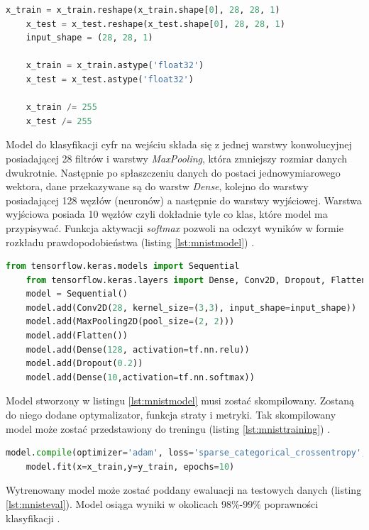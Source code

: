 \documentclass[a4paper,12pt,oneside]{book} %
\begin{document}
\begin{lstlisting}[language=Python, caption={Zmiana rozmiarów tablic i normalizacja \cite{mnistapp}}, label={lst:mnistreshape}]
	x_train = x_train.reshape(x_train.shape[0], 28, 28, 1)
	x_test = x_test.reshape(x_test.shape[0], 28, 28, 1)
	input_shape = (28, 28, 1)
	
	x_train = x_train.astype('float32')
	x_test = x_test.astype('float32')
	
	x_train /= 255
	x_test /= 255
\end{lstlisting}

Model do klasyfikacji cyfr na wejściu składa się z jednej warstwy konwolucyjnej posiadającej 28 filtrów i warstwy \emph{MaxPooling}, która zmniejszy rozmiar danych dwukrotnie. Następnie po spłaszczeniu danych do postaci jednowymiarowego wektora, dane przekazywane są do warstw \emph{Dense}, kolejno do warstwy posiadającej 128 węzłów (neuronów) a następnie do warstwy wyjściowej. Warstwa wyjściowa posiada 10 węzłów czyli dokładnie tyle co klas, które model ma przypisywać. Funkcja aktywacji \emph{softmax} pozwoli na odczyt wyników w formie rozkładu prawdopodobieństwa (listing \ref{lst:mnistmodel}) \cite{mnistapp}.

\begin{lstlisting}[language=Python, caption={Budowa modelu \cite{mnistapp}}, label={lst:mnistmodel}]
	from tensorflow.keras.models import Sequential
	from tensorflow.keras.layers import Dense, Conv2D, Dropout, Flatten, MaxPooling2D
	model = Sequential()
	model.add(Conv2D(28, kernel_size=(3,3), input_shape=input_shape))
	model.add(MaxPooling2D(pool_size=(2, 2)))
	model.add(Flatten())
	model.add(Dense(128, activation=tf.nn.relu))
	model.add(Dropout(0.2))
	model.add(Dense(10,activation=tf.nn.softmax))
\end{lstlisting}

Model stworzony w listingu \ref{lst:mnistmodel} musi zostać skompilowany. Zostaną do niego dodane optymalizator, funkcja straty i metryki. Tak skompilowany model może zostać przedstawiony do treningu (listing \ref{lst:mnisttraining}) \cite{mnistapp}. 

\begin{lstlisting}[language=Python, caption={Kompilacja i trening modelu \cite{mnistapp}}, label={lst:mnisttraining}]
	model.compile(optimizer='adam', loss='sparse_categorical_crossentropy', metrics=['accuracy'])
	model.fit(x=x_train,y=y_train, epochs=10)
\end{lstlisting}

Wytrenowany model może zostać poddany ewaluacji na testowych danych (listing \ref{lst:mnisteval}). Model osiąga wyniki w okolicach 98\%-99\% poprawności klasyfikacji \cite{mnistapp}. 
\end{document}
